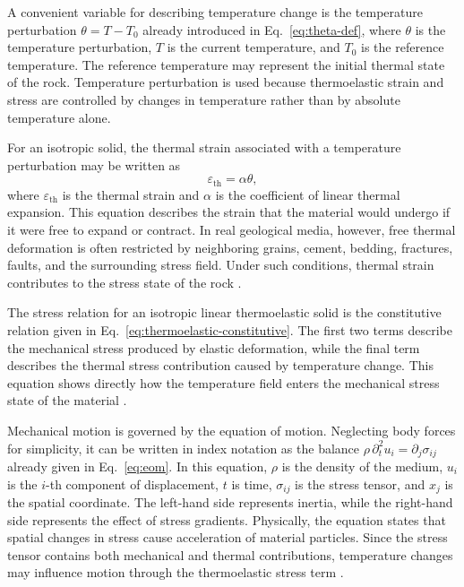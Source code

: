 A convenient variable for describing temperature change is the temperature perturbation $\theta = T - T_0$ already introduced in Eq.~\eqref{eq:theta-def},
where \(\theta\) is the temperature perturbation, \(T\) is the current temperature, and \(T_0\) is the reference temperature. The reference temperature may represent the initial thermal state of the rock. Temperature perturbation is used because thermoelastic strain and stress are controlled by changes in temperature rather than by absolute temperature alone.

For an isotropic solid, the thermal strain associated with a temperature perturbation may be written as
\begin{equation}
\varepsilon_{\mathrm{th}} = \alpha \theta,
\end{equation}
where \(\varepsilon_{\mathrm{th}}\) is the thermal strain and \(\alpha\) is the coefficient of linear thermal expansion. This equation describes the strain that the material would undergo if it were free to expand or contract. In real geological media, however, free thermal deformation is often restricted by neighboring grains, cement, bedding, fractures, faults, and the surrounding stress field. Under such conditions, thermal strain contributes to the stress state of the rock \cite{jaeger2007,nowacki1986}.

The stress relation for an isotropic linear thermoelastic solid is the constitutive relation given in Eq.~\eqref{eq:thermoelastic-constitutive}. The first two terms describe the mechanical stress produced by elastic deformation, while the final term describes the thermal stress contribution caused by temperature change. This equation shows directly how the temperature field enters the mechanical stress state of the material \cite{boley1960,nowacki1986}.

Mechanical motion is governed by the equation of motion. Neglecting body forces for simplicity, it can be written in index notation as the balance $\rho\,\partial_t^2 u_i = \partial_j\sigma_{ij}$ already given in Eq.~\eqref{eq:eom}.
In this equation, \(\rho\) is the density of the medium, \(u_i\) is the \(i\)-th component of displacement, \(t\) is time, \(\sigma_{ij}\) is the stress tensor, and \(x_j\) is the spatial coordinate. The left-hand side represents inertia, while the right-hand side represents the effect of stress gradients. Physically, the equation states that spatial changes in stress cause acceleration of material particles. Since the stress tensor contains both mechanical and thermal contributions, temperature changes may influence motion through the thermoelastic stress term \cite{aki2002,nowacki1986}.

